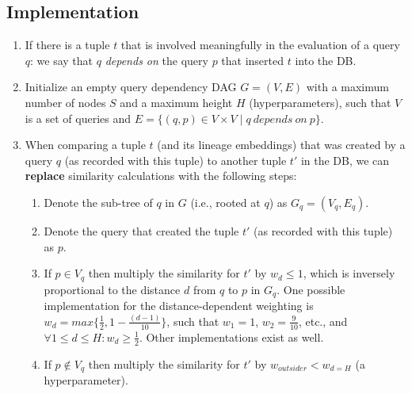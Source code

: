 \subsection{Implementation}
\begin{enumerate}
    \item If there is a tuple $t$ that is involved meaningfully in the evaluation of a query $q$: we say that $q$ \textit{depends on} the query $p$ that inserted $t$ into the DB.
    \item Initialize an empty query dependency DAG $G = (V, E)$ with a maximum number of nodes $S$ and a maximum height $H$ (hyperparameters), such that $V$ is a set of queries and $E = \{(q, p) \in V\! \times\!V\; |\; q\: depends\: on\: p\}$. 
    \item When comparing a tuple $t$ (and its lineage embeddings) that was created by a query $q$ (as recorded with this tuple) to another tuple $t'$ in the DB, we can \textbf{replace} similarity calculations with the following steps:
    \begin{enumerate}
        \item Denote the sub-tree of $q$ in $G$ (i.e., rooted at $q$) as $G_q = (V_q, E_q)$.
        \item Denote the query that created the tuple $t'$ (as recorded with this tuple) as $p$.
        \item If $p \in V_q$ then multiply the similarity for $t'$ by $w_d \leq 1$, which is inversely proportional to the distance $d$ from $q$ to $p$ in $G_q$. One possible implementation for the distance-dependent weighting is $w_d = max\{\frac{1}{2}, 1 - \frac{(d - 1)}{10}\}$, such that $w_1 = 1$, $w_2 = \frac{9}{10}$, etc., and $\forall 1\leq d\leq H: w_d \geq \frac{1}{2}$. Other implementations exist as well. 
        \item If $p \notin V_q$ then multiply the similarity for $t'$ by $w_{outsider} < w_{d=H}$ (a hyperparameter).
    \end{enumerate}
\end{enumerate}

